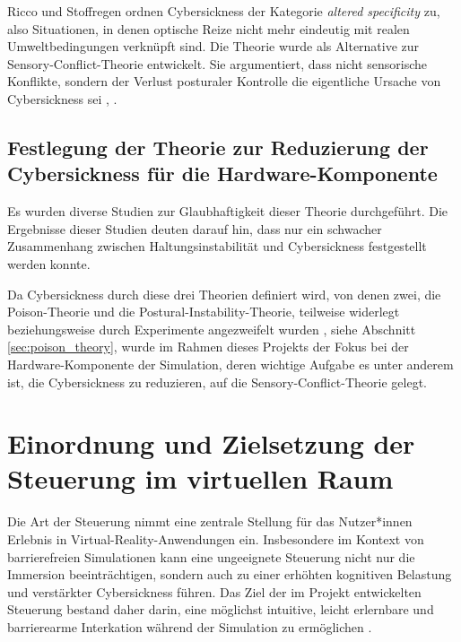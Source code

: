 Ricco und Stoffregen ordnen Cybersickness der Kategorie \emph{altered specificity} zu, also Situationen, in denen optische Reize nicht mehr eindeutig mit realen Umweltbedingungen verknüpft sind. Die Theorie wurde als Alternative zur Sensory-Conflict-Theorie entwickelt. Sie argumentiert, dass nicht sensorische Konflikte, sondern der Verlust posturaler Kontrolle die eigentliche Ursache von Cybersickness sei \cite{Josephj.LaViolaJr.2000}, \cite{Riccio1991}.

\subsection{Festlegung der Theorie zur Reduzierung der Cybersickness für die Hardware-Komponente}

Es wurden diverse Studien \cite{Riccio1991} zur Glaubhaftigkeit dieser Theorie durchgeführt. Die Ergebnisse dieser Studien deuten darauf hin, dass nur ein schwacher Zusammenhang zwischen Haltungsinstabilität und Cybersickness festgestellt werden konnte.

Da Cybersickness durch diese drei Theorien definiert wird, von denen zwei, die Poison-Theorie und die Postural-Instability-Theorie, teilweise widerlegt beziehungsweise durch Experimente angezweifelt wurden \cite{Riccio1991}, siehe Abschnitt \ref{sec:poison_theory}, wurde im Rahmen dieses Projekts der Fokus bei der Hardware-Komponente der Simulation, deren wichtige Aufgabe es unter anderem ist, die Cybersickness zu reduzieren, auf die Sensory-Conflict-Theorie gelegt.

\section{Einordnung und Zielsetzung der Steuerung im virtuellen Raum}
Die Art der Steuerung nimmt eine zentrale Stellung für das Nutzer*innen Erlebnis in Virtual-Reality-Anwendungen ein. Insbesondere im Kontext von barrierefreien Simulationen kann eine ungeeignete Steuerung nicht nur die Immersion beeinträchtigen, sondern auch zu einer erhöhten kognitiven Belastung und verstärkter Cybersickness führen. Das Ziel der im Projekt entwickelten Steuerung bestand daher darin, eine möglichst intuitive, leicht erlernbare und barrierearme Interkation während der Simulation zu ermöglichen \cite{Chen2024}.

